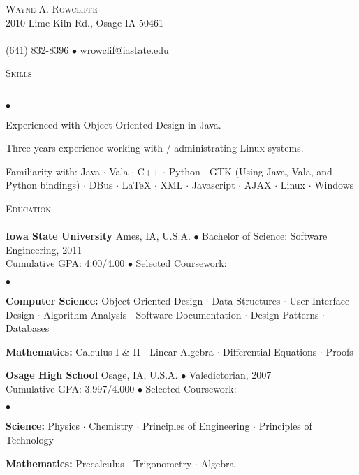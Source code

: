 \documentclass{article}
\newcommand{\lineunder} {
	\vspace*{-8pt} \\ \hspace*{-18pt} \hrulefill \\
}
\newcommand{\header}[1] {
	{\hspace*{-15pt}\vspace*{6pt} \textsc{#1}} \vspace*{-6pt} \lineunder
}
\newcommand{\contact}[3] {
	\vspace*{-8pt}\begin{center}{\LARGE \scshape {#1}}\\#2 \lineunder#3\end{center}\vspace*{-8pt}
}
\newenvironment{achievements} {
	\begin{list}{$\bullet$}
		{\topsep 0pt \itemsep -2pt}
	}{
		\vspace*{4pt}\end{list}
	}
\newcommand{\schoolwithcourses}[4]{
	\textbf{#1} #2 $\bullet$ #3\\
	#4 $\bullet$  Selected Coursework:\\
	\vspace*{5pt}
}
\newcommand{\area}[1] {\textbf{#1:}}
\newcommand{\subject}[1] {#1 $\cdot$}
\newcommand{\lastsubject}[1] {#1}
\begin{document}
\small
\smallskip
\vspace*{-44pt}

\contact{Wayne A. Rowcliffe}
{2010 Lime Kiln Rd., Osage IA 50461}
{(641) 832-8396 $\bullet$ wrowclif@iastate.edu}%

\header{Skills}

	\begin{achievements}
		\item{Experienced with Object Oriented Design in Java.}
		\item{Three years experience working with / administrating Linux systems.}
		\item{Familiarity with:
			\subject{Java}
			\subject{Vala}
			\subject{C++}
			\subject{Python}
			\subject{GTK (Using Java, Vala, and Python bindings)}
			\subject{DBus}
			\subject{\LaTeX{}}
			\subject{XML}
			\subject{Javascript}
			\subject{AJAX}
			\subject{Linux}
			\lastsubject{Windows}
		}

	\end{achievements}

\header{Education}

	\schoolwithcourses{Iowa State University}{Ames, IA, U.S.A.}{Bachelor of Science: Software Engineering, 2011}
	{Cumulative GPA: 4.00/4.00}
		\begin{achievements}
			\item{
				\area{Computer Science}
				\subject{Object Oriented Design}
				\subject{Data Structures}
				\subject{User Interface Design}
				\subject{Algorithm Analysis}
				\subject{Software Documentation}
				\subject{Design Patterns}
				\lastsubject{Databases}
			}
			\item{
				\area{Mathematics}
				\subject{Calculus I \& II}
				\subject{Linear Algebra}
				\subject{Differential Equations}
				\lastsubject{Proofs}
			}
		\end{achievements}

	\schoolwithcourses{Osage High School}{Osage, IA, U.S.A.}{Valedictorian, 2007}
	{Cumulative GPA: 3.997/4.000}
		\begin{achievements}
			\item{
				\area{Science}
				\subject{Physics}
				\subject{Chemistry}
				\subject{Principles of Engineering}
				\lastsubject{Principles of Technology}
			}
			\item{
				\area{Mathematics}
				\subject{Precalculus}
				\subject{Trigonometry}
				\lastsubject{Algebra}
			}
		\end{achievements}
\end{document}
